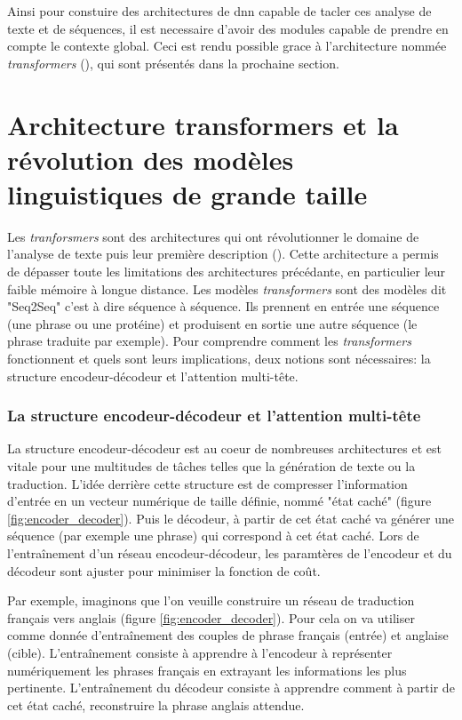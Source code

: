 Ainsi pour constuire des architectures de \gls{dnn} capable de tacler ces analyse de texte et de séquences, il est necessaire d'avoir des modules capable de prendre en compte le contexte global. Ceci est rendu possible grace à l'architecture nommée \textit{transformers} (\cite{vaswani_attention_2017}), qui sont présentés dans la prochaine section.


\section{Architecture transformers et la révolution des modèles linguistiques de grande taille}
Les \textit{tranforsmers} sont des architectures qui ont révolutionner le domaine de l'analyse de texte puis leur première description (\cite{vaswani_attention_2017}). Cette architecture a permis de dépasser toute les limitations des architectures précédante, en particulier leur faible mémoire à longue distance. Les modèles \textit{transformers} sont des modèles dit "Seq2Seq" c'est à dire séquence à séquence. Ils prennent en entrée une séquence (une phrase ou une protéine) et produisent en sortie une autre séquence (le phrase traduite par exemple). Pour comprendre comment les \textit{transformers} fonctionnent et quels sont leurs implications, deux notions sont nécessaires: la structure encodeur-décodeur et l'attention multi-tête.



\subsubsection{La structure encodeur-décodeur et l'attention multi-tête}
La structure encodeur-décodeur est au coeur de nombreuses architectures et est vitale pour une multitudes de tâches telles que la génération de texte ou la traduction. L'idée derrière cette structure est de compresser l'information d'entrée en un vecteur numérique de taille définie, nommé "état caché" (figure \ref{fig:encoder_decoder}). Puis le décodeur, à partir de cet état caché va générer une séquence (par exemple une phrase) qui correspond à cet état caché. Lors de l'entraînement d'un réseau encodeur-décodeur, les paramtères de l'encodeur et du décodeur sont ajuster pour minimiser la fonction de coût. 

Par exemple, imaginons que l'on veuille construire un réseau de traduction français vers anglais (figure \ref{fig:encoder_decoder}). Pour cela on va utiliser comme donnée d'entraînement des couples de phrase français (entrée) et anglaise (cible). L'entraînement consiste à apprendre à l'encodeur à représenter numériquement les phrases français en extrayant les informations les plus pertinente. L'entraînement du décodeur consiste à apprendre comment à partir de cet état caché, reconstruire la phrase anglais attendue.

